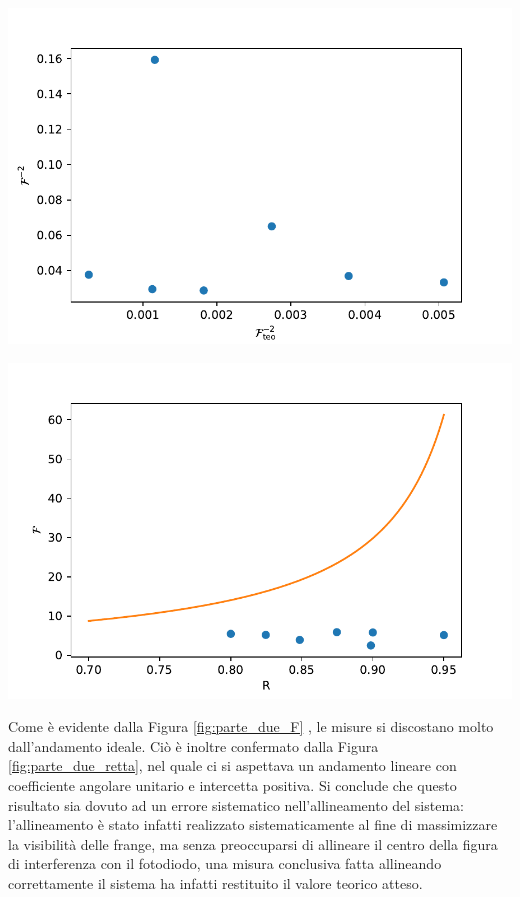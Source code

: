 \documentclass[10pt,oneside,a4paper]{article}
\newenvironment{Figure}
  {\par\medskip\noindent\minipage{\linewidth}}
  {\endminipage\par\medskip}
\begin{document}
\begin{multicols}{2}
\begin{Figure}
\begin{center}
	\includegraphics[width=\linewidth]{parte_due.pdf}
	\label{fig:parte_due_retta}
	\end{center}
\end{Figure}
\begin{Figure}
	\begin{center}
	\includegraphics[width=\linewidth]{parte_due_F.pdf}
	\label{fig:parte_due_F}
	\end{center}
\end{Figure}
Come è evidente dalla Figura \ref{fig:parte_due_F} , le misure si discostano molto dall'andamento ideale. Ciò è inoltre confermato dalla Figura \ref{fig:parte_due_retta}, nel quale ci si aspettava un andamento lineare con coefficiente angolare unitario e intercetta positiva. Si conclude che questo risultato sia dovuto ad un errore sistematico nell'allineamento del sistema: l'allineamento è stato infatti realizzato sistematicamente al fine di massimizzare la visibilità delle frange, ma senza preoccuparsi di allineare il centro della figura di interferenza con il fotodiodo, una misura conclusiva fatta allineando correttamente il sistema ha infatti restituito il valore teorico atteso.



\end{multicols}
\end{document}
